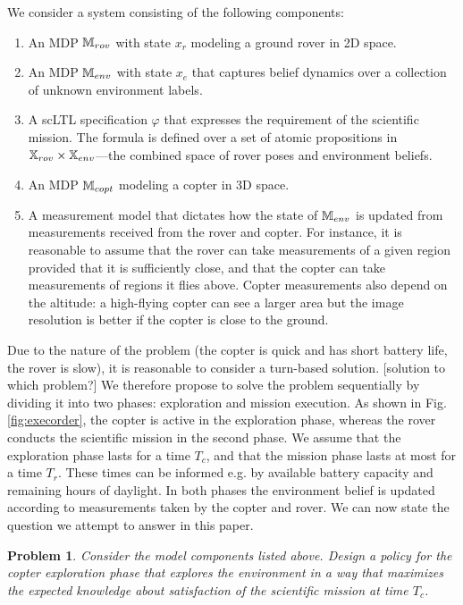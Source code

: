 \documentclass[conference]{IEEEtran}
\newtheorem{problem}{Problem}
\newcommand{\sofie}[1]{{\color{orange}#1}}
\begin{document}
We consider a system consisting of the following components:
\begin{enumerate}
	\item An MDP $\mathbb{M}_{rov}$ with state $x_r$ modeling a ground rover in 2D space.
	\item An MDP $\mathbb{M}_{env}$ with state $x_e$ that captures belief dynamics over a collection of unknown environment labels.
	\item A scLTL specification $\varphi$ that expresses the requirement of the scientific mission. The formula is defined over a set of atomic propositions in $\mathbb{X}_{rov} \times \mathbb{X}_{env}$---the combined space of rover poses and environment beliefs. 
	\item An MDP $\mathbb{M}_{copt}$ modeling a copter in 3D space.
	\item A measurement model that dictates how the state of $\mathbb{M}_{env}$ is updated from measurements received from the rover and copter. For instance, it is reasonable to assume that the rover can take measurements of a given region provided that it is sufficiently close, and that the copter can take measurements of regions it flies above. Copter measurements also depend on the altitude: a high-flying copter can see a larger area but the image resolution is better if the copter is close to the ground.    
\end{enumerate}

Due to the nature of the problem (the copter is quick and has short battery life, the rover is slow), it is reasonable to consider a turn-based solution.
\sofie{[solution to which problem?]}
 We therefore propose to solve the problem sequentially by dividing it into two phases: exploration and mission execution. As shown in Fig. \ref{fig:execorder}, the copter is active in the exploration phase, whereas the rover conducts the scientific mission in the second phase. We assume that the exploration phase lasts for a time $T_c$, and that the mission phase lasts at most for a time $T_r$. These times can be informed e.g. by available battery capacity and remaining hours of daylight. In both phases the environment belief is updated according to measurements taken by the copter and rover. We can now state the question we attempt to answer in this paper.
\begin{problem}
\label{prob:main}
  Consider the model components listed above. Design a policy for the copter exploration phase that explores the environment in a way that maximizes the expected knowledge about satisfaction of the scientific mission at time $T_c$.
\end{problem}
\end{document}
